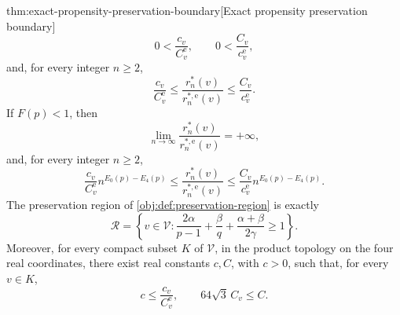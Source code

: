 \begin{theoremv}{thm:exact-propensity-preservation-boundary}[Exact propensity preservation boundary]
\[
0<\frac{c_v}{C^{\mathrm e}_v},
\qquad
0<\frac{C_v}{c^{\mathrm e}_v},
\]
and, for every integer \(n\ge2\),
\[
\frac{c_v}{C^{\mathrm e}_v}
\le
\frac{r_n^*(v)}{r_n^{*,\mathrm e}(v)}
\le
\frac{C_v}{c^{\mathrm e}_v}.
\]
If \(F(p)<1\), then
\[
\lim_{n\to\infty}\frac{r_n^*(v)}{r_n^{*,\mathrm e}(v)}=+\infty,
\]
and, for every integer \(n\ge2\),
\[
\frac{c_v}{C^{\mathrm e}_v}n^{E_0(p)-E_4(p)}
\le
\frac{r_n^*(v)}{r_n^{*,\mathrm e}(v)}
\le
\frac{C_v}{c^{\mathrm e}_v}n^{E_0(p)-E_4(p)}.
\]
The preservation region of \cref{obj:def:preservation-region} is exactly
\[
\mathcal R=
\left\{v\in\mathcal V:
\frac{2\alpha}{p-1}+\frac{\beta}{q}
+\frac{\alpha+\beta}{2\gamma}\ge1\right\}.
\]
Moreover, for every compact subset \(K\) of \(\mathcal V\), in the product topology on the four real coordinates, there exist real constants \(c,C\), with \(c>0\), such that, for every \(v\in K\),
\[
c\le\frac{c_v}{C^{\mathrm e}_v},
\qquad
64\sqrt3\,C_v\le C.
\]
\end{theoremv}
